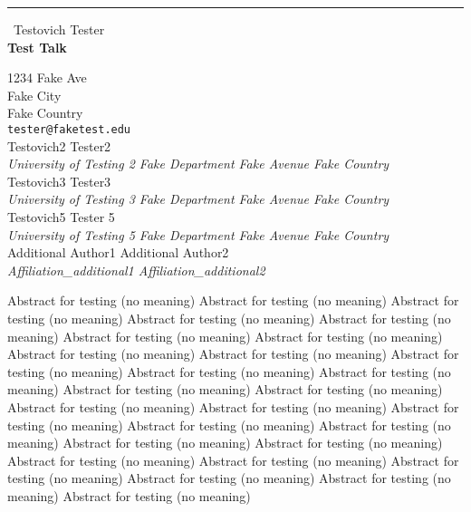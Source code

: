 \documentclass{report}
\begin{document}
\begin{center}
\rule{6in}{1pt} \
{\large Testovich Tester \\
{\bf Test Talk}}

1234 Fake Ave \\ Fake City \\ Fake Country
\\
{\tt tester@faketest.edu}\\
Testovich2 Tester2\\
{\em University of Testing 2
Fake Department
Fake Avenue
Fake Country}\\
Testovich3 Tester3\\
{\em University of Testing 3
Fake Department
Fake Avenue
Fake Country}\\
Testovich5 Tester 5\\
{\em University of Testing 5
Fake Department
Fake Avenue
Fake Country}\\
	Additional Author1
	Additional Author2\\
{\em Affiliation\_additional1
Affiliation\_additional2 }\end{center}

Abstract for testing (no meaning)
Abstract for testing (no meaning)
Abstract for testing (no meaning)
Abstract for testing (no meaning)
Abstract for testing (no meaning)
Abstract for testing (no meaning)
Abstract for testing (no meaning)
Abstract for testing (no meaning)
Abstract for testing (no meaning)
Abstract for testing (no meaning)
Abstract for testing (no meaning)
Abstract for testing (no meaning)
Abstract for testing (no meaning)
Abstract for testing (no meaning)
Abstract for testing (no meaning)
Abstract for testing (no meaning)
Abstract for testing (no meaning)
Abstract for testing (no meaning)
Abstract for testing (no meaning)
Abstract for testing (no meaning)
Abstract for testing (no meaning)
Abstract for testing (no meaning)
Abstract for testing (no meaning)
Abstract for testing (no meaning)
Abstract for testing (no meaning)
Abstract for testing (no meaning)
Abstract for testing (no meaning)
\end{document}
